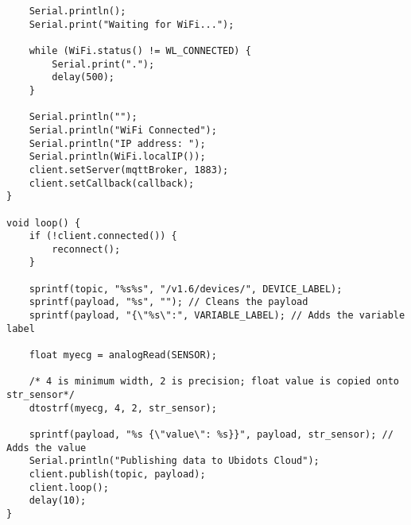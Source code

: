 \begin{lstlisting}
    Serial.println();
    Serial.print("Waiting for WiFi...");
    
    while (WiFi.status() != WL_CONNECTED) {
        Serial.print(".");
        delay(500);
    }
    
    Serial.println("");
    Serial.println("WiFi Connected");
    Serial.println("IP address: ");
    Serial.println(WiFi.localIP());
    client.setServer(mqttBroker, 1883);
    client.setCallback(callback);  
}

void loop() {
    if (!client.connected()) {
        reconnect();
    }
    
    sprintf(topic, "%s%s", "/v1.6/devices/", DEVICE_LABEL);
    sprintf(payload, "%s", ""); // Cleans the payload
    sprintf(payload, "{\"%s\":", VARIABLE_LABEL); // Adds the variable label
    
    float myecg = analogRead(SENSOR); 
    
    /* 4 is minimum width, 2 is precision; float value is copied onto str_sensor*/
    dtostrf(myecg, 4, 2, str_sensor);
    
    sprintf(payload, "%s {\"value\": %s}}", payload, str_sensor); // Adds the value
    Serial.println("Publishing data to Ubidots Cloud");
    client.publish(topic, payload);
    client.loop();
    delay(10);
}


\end{lstlisting}
